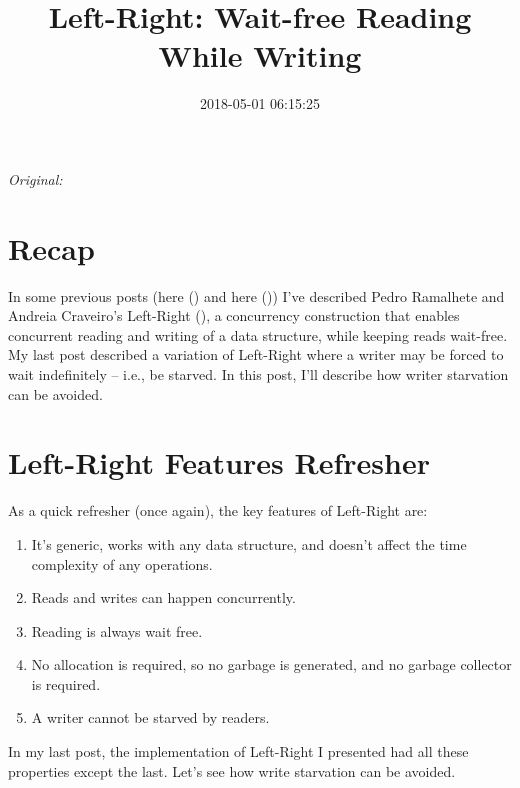 \documentclass[11pt]{article}
\begin{document}
\title{Left-Right: Wait-free Reading While Writing}
\date{2018-05-01 06:15:25}
\maketitle

\noindent\textit{Original: }\texttt{}\par
\medskip
\section{Recap}

In some previous posts (here (\texttt{}) and here (\texttt{})) I've described Pedro Ramalhete and Andreia Craveiro's Left-Right (\texttt{}), a concurrency construction that enables concurrent reading and writing of a data structure, while keeping reads wait-free. My last post described a variation of Left-Right where a writer may be forced to wait indefinitely -- i.e., be starved. In this post, I'll describe how writer starvation can be avoided.

\section{Left-Right Features Refresher}

As a quick refresher (once again), the key features of Left-Right are:
\begin{enumerate}
\item It's generic, works with any data structure, and doesn't affect the time complexity of any operations.
\item Reads and writes can happen concurrently.
\item Reading is always wait free.
\item No allocation is required, so no garbage is generated, and no garbage collector is required.
\item A writer cannot be starved by readers.
\end{enumerate}

In my last post, the implementation of Left-Right I presented had all these properties except the last. Let's see how write starvation can be avoided.
\end{document}
